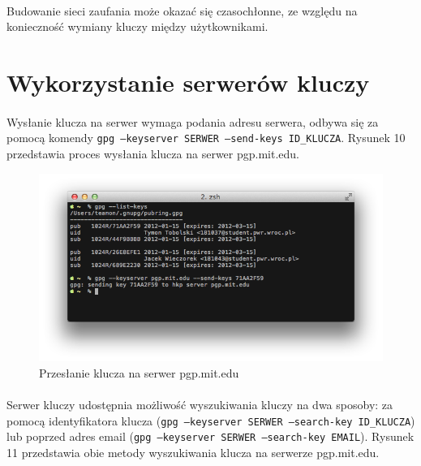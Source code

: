 \documentclass[wide,a4paper,titlepage,12pt] {article}
\begin{document}
  \paragraph{}
  Budowanie sieci zaufania może okazać się czasochłonne, ze względu na konieczność wymiany kluczy między użytkownikami.

  \newpage
  \paragraph{}
  \newpage

  \section{Wykorzystanie serwerów kluczy}
  \paragraph{}
  Wysłanie klucza na serwer wymaga podania adresu serwera, odbywa się za pomocą komendy \texttt{gpg --keyserver SERWER --send-keys ID\_KLUCZA}. Rysunek 10 przedstawia proces wysłania klucza na serwer pgp.mit.edu.

  \begin{figure}[h!]
    \begin{center}
      \includegraphics[width=\textwidth]{img/10.png}
      \caption{Przesłanie klucza na serwer pgp.mit.edu}
    \end{center}
  \end{figure}

  \paragraph{}
  Serwer kluczy udostępnia możliwość wyszukiwania kluczy na dwa sposoby: za pomocą identyfikatora klucza (\texttt{gpg --keyserver SERWER --search-key ID\_KLUCZA}) lub poprzed adres email (\texttt{gpg --keyserver SERWER --search-key EMAIL}). Rysunek 11 przedstawia obie metody wyszukiwania klucza na serwerze pgp.mit.edu.
\end{document}
